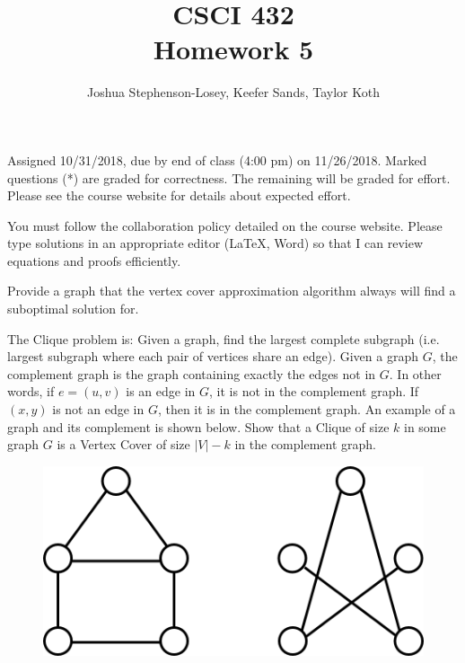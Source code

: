 \documentclass[12pt]{article}
\author{Joshua Stephenson-Losey,
Keefer Sands,
Taylor Koth}
\newenvironment{problem}[2][Problem]
{\begin{trivlist}
\item[\hskip \labelsep {\bfseries #1}\hskip \labelsep {\bfseries #2.}]}{\end{trivlist}}
\begin{document}
 
\title{CSCI 432\\Homework 5}
\date{}
\maketitle

Assigned 10/31/2018, due by end of class (4:00 pm) on 11/26/2018. Marked questions (*) are graded for correctness. The remaining will be graded for effort. Please see the course website for details about expected effort.

You must follow the collaboration policy detailed on the course website. Please type solutions in an appropriate editor (\LaTeX, Word) so that I can review equations and proofs efficiently. 

\begin{problem}{1*}
Provide a graph that the vertex cover approximation algorithm always will find a suboptimal solution for.
\end{problem}


\begin{problem}{2*}
The Clique problem is: Given a graph, find the largest complete subgraph (i.e. largest subgraph where each pair of vertices share an edge). Given a graph $G$, the complement graph is the graph containing exactly the edges not in $G$. In other words, if $e=(u,v)$ is an edge in $G$, it is not in the complement graph. If $(x,y)$ is not an edge in $G$, then it is in the complement graph. An example of a graph and its complement is shown below. Show that a Clique of size $k$ in some graph $G$ is a Vertex Cover of size $|V|-k$ in the complement graph.

\begin{figure}[H]
\centering
\includegraphics[scale=.5]{Homework5_comp.png}
\end{figure}
\end{problem}
\end{document}
